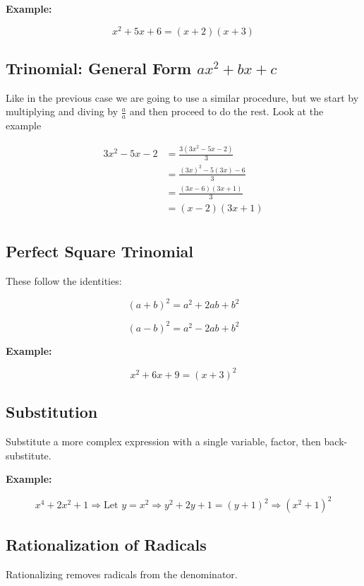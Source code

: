 \textbf{Example:}

\[
  x^2 + 5x + 6 = (x + 2)(x + 3)
\]

\subsection{Trinomial: General Form \texorpdfstring{\(ax^2 + bx + c\)}{ax² + bx + c}}

Like in the previous case we are going to use a similar procedure, but we start by
multiplying and diving by \(\frac{a}{a}\) and then proceed to do the rest. Look at the example

\begin{align*}
3x^2 -5x - 2 &= \frac{3(3x^2 -5x - 2)}{3} \\
             &= \frac{{(3x)}^2 -5(3x) - 6}{3}\\ 
             &= \frac{(3x- 6)(3x+1)}{3} \\
             &= (x- 2)(3x +1) \\
\end{align*}

\subsection{Perfect Square Trinomial}

These follow the identities:

\[
  {(a + b)}^2 = a^2 + 2ab + b^2
\]

\[
  {(a - b)}^2 = a^2 - 2ab + b^2
\]

\textbf{Example:}

\[
  x^2 + 6x + 9 = {(x + 3)}^2
\]

\subsection{Substitution}

Substitute a more complex expression with a single variable, factor, then back-substitute.

\textbf{Example:}

\[
  x^4 + 2x^2 + 1 \Rightarrow \text{Let } y = x^2 \Rightarrow y^2 + 2y + 1 = {(y + 1)}^2 
  \Rightarrow {(x^2 + 1)}^2
\]

\subsection{Rationalization of Radicals}

Rationalizing removes radicals from the denominator.

